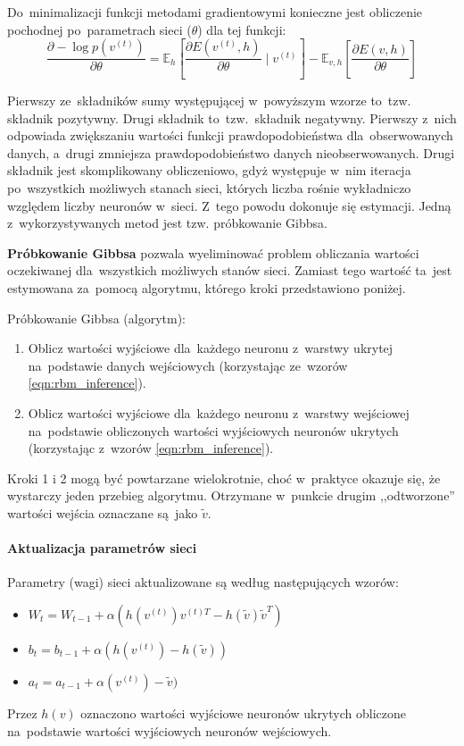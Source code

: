Do~minimalizacji funkcji metodami gradientowymi konieczne jest obliczenie pochodnej po~parametrach sieci ($\theta$)
dla tej funkcji:
$$\frac{\partial-\log{p(v^{(t)})}}{\partial{\theta}}=\mathbb{E}_h[\frac{\partial{E(v^{(t)},h)}}{\partial{\theta}}\mid{v^{(t)}}]-\mathbb{E}_{v,h}[\frac{\partial{E(v,h)}}{\partial{\theta}}]$$

Pierwszy ze~składników sumy występującej w~powyższym wzorze to~tzw. składnik pozytywny. Drugi składnik
to~tzw.~składnik negatywny. Pierwszy z~nich odpowiada zwiększaniu wartości funkcji prawdopodobieństwa
dla~obserwowanych danych, a~drugi zmniejsza prawdopodobieństwo danych nieobserwowanych. Drugi składnik jest
skomplikowany obliczeniowo, gdyż występuje w~nim iteracja po~wszystkich możliwych stanach sieci, których
liczba rośnie wykładniczo względem liczby neuronów w~sieci. Z~tego powodu dokonuje się estymacji. Jedną
z~wykorzystywanych metod jest tzw. próbkowanie Gibbsa. 

\textbf{Próbkowanie Gibbsa} pozwala wyeliminować problem obliczania wartości oczekiwanej dla~wszystkich
możliwych stanów sieci. Zamiast tego wartość ta~jest estymowana za~pomocą algorytmu, którego kroki
przedstawiono poniżej.

Próbkowanie Gibbsa (algorytm):
\begin{enumerate}
  \item Oblicz wartości wyjściowe dla~każdego neuronu z~warstwy ukrytej na~podstawie danych wejściowych
  (korzystając ze~wzorów \ref{eqn:rbm_inference}).
  \item Oblicz wartości wyjściowe dla~każdego neuronu z~warstwy wejściowej na~podstawie obliczonych wartości
  wyjściowych neuronów ukrytych (korzystając z~wzorów \ref{eqn:rbm_inference}).
\end{enumerate}

Kroki 1 i 2 mogą być powtarzane wielokrotnie, choć w~praktyce okazuje się, że wystarczy jeden
przebieg algorytmu. Otrzymane w~punkcie drugim ,,odtworzone'' wartości wejścia oznaczane są~jako $\tilde{v}$.

\paragraph{Aktualizacja parametrów sieci}
Parametry (wagi) sieci aktualizowane są według następujących wzorów:
\begin{itemize}
  \item $W_t=W_{t-1}+\alpha(h(v^{(t)})v^{(t)T}-h(\tilde{v})\tilde{v}^{T})$
  \item $b_t=b_{t-1}+\alpha(h(v^{(t)})-h(\tilde{v}))$
  \item $a_t=a_{t-1}+\alpha(v^{(t)})-\tilde{v})$
\end{itemize}
\vspace{1cm}

Przez $h(v)$ oznaczono wartości wyjściowe neuronów ukrytych obliczone na~podstawie wartości wyjściowych
neuronów wejściowych.

